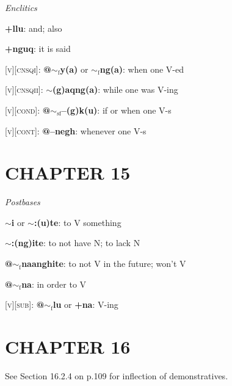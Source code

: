 \documentclass{article}
\begin{document}
\textit{Enclitics}
\begin{description}
\item \textbf{+llu}: and; also
\item \textbf{+nguq}: it is said
\end{description}

\bigskip

\textsc{[v][cnsqi]}: \textbf{@$\sim_\text{f}$y(a)} or \textbf{$\sim_\text{f}$ng(a)}: when one V-ed

\textsc{[v][cnsqii]}: \textbf{$\sim$(g)aqng(a)}: while one was V-ing

\bigskip

\textsc{[v][cond]}: \textbf{@$\sim_\text{sf}$--(g)k(u)}: if or when one V-s

\bigskip

\textsc{[v][cont]}: \textbf{@--negh}: whenever one V-s


\section{CHAPTER 15}

\textit{Postbases}
\begin{description}
\item \textbf{$\sim$i} or \textbf{$\sim$:(u)te}: to V something
\item \textbf{$\sim$:(ng)ite}: to not have N; to lack N
\item \textbf{@$\sim_\text{f}$naanghite}: to not V in the future; won't V
\item \textbf{@$\sim_\text{f}$na}: in order to V
\end{description}

\bigskip

\textsc{[v][sub]}: \textbf{@$\sim_\text{f}$lu} or \textbf{+na}: V-ing


\section{CHAPTER 16}

See Section 16.2.4 on p.109 for inflection of demonstratives.

\end{document}

